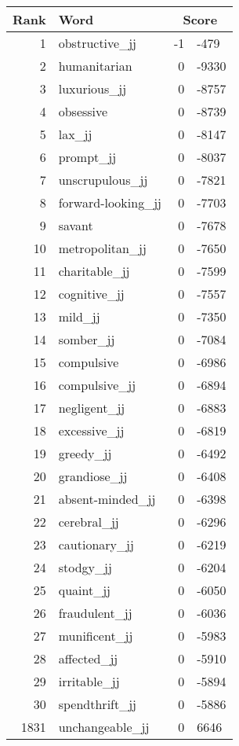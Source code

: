 \begin{longtable}[!htbp]{| rlr@{.}l |}
    \hline
    \textbf{Rank} & \textbf{Word} & \multicolumn{2}{c|}{\textbf{Score}} \\
    \hline
    \endhead
    1 & obstructive\_jj & -1 & -479 \\
    2 & humanitarian & 0 & -9330 \\
    3 & luxurious\_jj & 0 & -8757 \\
    4 & obsessive & 0 & -8739 \\
    5 & lax\_jj & 0 & -8147 \\
    6 & prompt\_jj & 0 & -8037 \\
    7 & unscrupulous\_jj & 0 & -7821 \\
    8 & forward-looking\_jj & 0 & -7703 \\
    9 & savant & 0 & -7678 \\
    10 & metropolitan\_jj & 0 & -7650 \\
    11 & charitable\_jj & 0 & -7599 \\
    12 & cognitive\_jj & 0 & -7557 \\
    13 & mild\_jj & 0 & -7350 \\
    14 & somber\_jj & 0 & -7084 \\
    15 & compulsive & 0 & -6986 \\
    16 & compulsive\_jj & 0 & -6894 \\
    17 & negligent\_jj & 0 & -6883 \\
    18 & excessive\_jj & 0 & -6819 \\
    19 & greedy\_jj & 0 & -6492 \\
    20 & grandiose\_jj & 0 & -6408 \\
    21 & absent-minded\_jj & 0 & -6398 \\
    22 & cerebral\_jj & 0 & -6296 \\
    23 & cautionary\_jj & 0 & -6219 \\
    24 & stodgy\_jj & 0 & -6204 \\
    25 & quaint\_jj & 0 & -6050 \\
    26 & fraudulent\_jj & 0 & -6036 \\
    27 & munificent\_jj & 0 & -5983 \\
    28 & affected\_jj & 0 & -5910 \\
    29 & irritable\_jj & 0 & -5894 \\
    30 & spendthrift\_jj & 0 & -5886 \\
    1831 & unchangeable\_jj & 0 & 6646 \\

\end{longtable}
